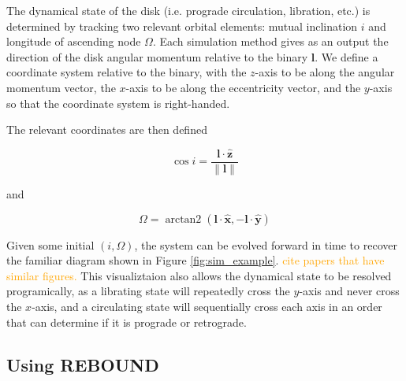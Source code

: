 \documentclass[twocolumn]{aastex631}
\newcommand{\TJ}[1]{\textcolor{orange}{#1}}
\DeclareMathOperator{\arctantwo}{arctan2}
\begin{document}
The dynamical state of the disk (i.e. prograde circulation, libration, etc.) is determined by tracking two relevant orbital elements:
mutual inclination $i$ and longitude of ascending node $\Omega$. Each simulation method gives as an output the direction of the disk angular momentum relative to
the binary $\bm{l}$. We define a coordinate system relative to the binary, with the $z$-axis to be along the
angular momentum vector, the $x$-axis to be along the eccentricity vector, and the
$y$-axis so that the coordinate system is right-handed.

The relevant coordinates are then defined

\begin{equation}
    \cos{i} = \frac{\bm{l} \cdot \hat{\bm{z}}}{\|\bm l\|}
    \label{eq:inclination}
\end{equation}

and

\begin{equation}
    \Omega = \arctantwo (\bm{l} \cdot \hat{\bm{x}}, -\bm{l} \cdot \hat{\bm{y}})
    \label{eq:omega}
\end{equation}

Given some initial $(i,\Omega)$, the system can be evolved forward in time to recover the familiar diagram shown in Figure \ref{fig:sim_example}.
\TJ{cite papers that have similar figures.}
This visualiztaion also allows the dynamical state to be resolved programically, as a librating state will repeatedly cross the $y$-axis and never
cross the $x$-axis, and a circulating state will sequentially cross each axis in an order that can determine if it is prograde or retrograde.


\subsection{Using {\sc REBOUND}}
\label{subsec:reb}
\end{document}
